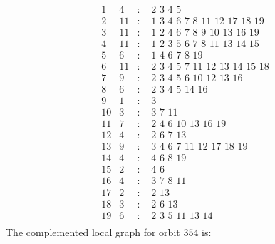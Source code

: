 \documentclass[12pt]{article}
\begin{document}
\begin{equation*}
\begin{array}{rrcl}
1&4&:&\,\,2\,\,3\,\,4\,\,5\\
2&11&:&\,\,1\,\,3\,\,4\,\,6\,\,7\,\,8\,\,11\,\,12\,\,17\,\,18\,\,19\\
3&11&:&\,\,1\,\,2\,\,4\,\,6\,\,7\,\,8\,\,9\,\,10\,\,13\,\,16\,\,19\\
4&11&:&\,\,1\,\,2\,\,3\,\,5\,\,6\,\,7\,\,8\,\,11\,\,13\,\,14\,\,15\\
5&6&:&\,\,1\,\,4\,\,6\,\,7\,\,8\,\,19\\
6&11&:&\,\,2\,\,3\,\,4\,\,5\,\,7\,\,11\,\,12\,\,13\,\,14\,\,15\,\,18\\
7&9&:&\,\,2\,\,3\,\,4\,\,5\,\,6\,\,10\,\,12\,\,13\,\,16\\
8&6&:&\,\,2\,\,3\,\,4\,\,5\,\,14\,\,16\\
9&1&:&\,\,3\\
10&3&:&\,\,3\,\,7\,\,11\\
11&7&:&\,\,2\,\,4\,\,6\,\,10\,\,13\,\,16\,\,19\\
12&4&:&\,\,2\,\,6\,\,7\,\,13\\
13&9&:&\,\,3\,\,4\,\,6\,\,7\,\,11\,\,12\,\,17\,\,18\,\,19\\
14&4&:&\,\,4\,\,6\,\,8\,\,19\\
15&2&:&\,\,4\,\,6\\
16&4&:&\,\,3\,\,7\,\,8\,\,11\\
17&2&:&\,\,2\,\,13\\
18&3&:&\,\,2\,\,6\,\,13\\
19&6&:&\,\,2\,\,3\,\,5\,\,11\,\,13\,\,14\\
\end{array}
\end{equation*}
The complemented local graph for orbit $354$ is:
\end{document}
